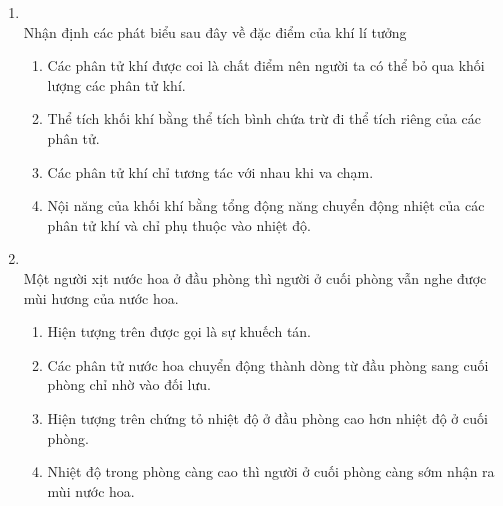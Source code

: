 \begin{enumerate}[label=\bfseries Câu \arabic*:, leftmargin=1.7cm]
\item {}\\
Nhận định các phát biểu sau đây về đặc điểm của khí lí tưởng
\begin{enumerate}[label=\alph*)]
	\item Các phân tử khí được coi là chất điểm nên người ta có thể bỏ qua khối lượng các phân tử khí.
	\item Thể tích khối khí bằng thể tích bình chứa trừ đi thể tích riêng của các phân tử.
	\item Các phân tử khí chỉ tương tác với nhau khi va chạm.
	\item Nội năng của khối khí bằng tổng động năng chuyển động nhiệt của các phân tử khí và chỉ phụ thuộc vào nhiệt độ.
\end{enumerate}

\item {}\\
Một người xịt nước hoa ở đầu phòng thì người ở cuối phòng vẫn nghe được mùi hương của nước hoa.
\begin{enumerate}[label=\alph*)]
	\item Hiện tượng trên được gọi là sự khuếch tán.
	\item Các phân tử nước hoa chuyển động thành dòng từ đầu phòng sang cuối phòng chỉ nhờ vào đối lưu.
	\item Hiện tượng trên chứng tỏ nhiệt độ ở đầu phòng cao hơn nhiệt độ ở cuối phòng.
	\item Nhiệt độ trong phòng càng cao thì người ở cuối phòng càng sớm nhận ra mùi nước hoa.
\end{enumerate}



\end{enumerate}
